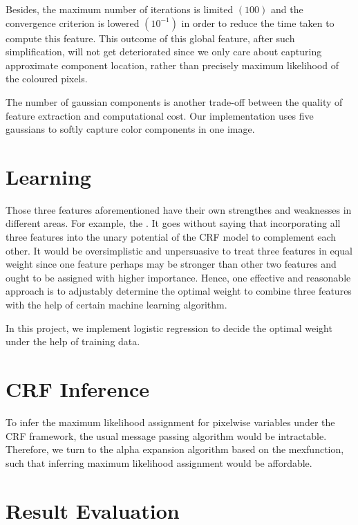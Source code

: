 \documentclass[10pt,twocolumn,letterpaper]{article}
\begin{document}
    Besides, the maximum number of iterations is limited $(100)$ and the convergence criterion is lowered $(10^{-1})$
    in order to reduce the time taken to compute this feature.  This outcome of this global feature, after such
    simplification, will not get deteriorated since we only care about capturing 
    approximate component location, rather than precisely maximum likelihood of the coloured pixels.

    The number of gaussian components is another trade-off between the quality of feature extraction
    and computational cost. Our implementation uses five gaussians to softly capture color components in one image. 

\section{Learning}
Those three features aforementioned have their own strengthes and weaknesses in different areas. For example, the .
It goes without saying that incorporating all three features into the unary potential of the CRF model 
to complement each other. It would be oversimplistic and unpersuasive to treat three features in equal weight 
since one feature perhaps may be stronger than other two features and ought to be assigned with higher importance.
Hence, one effective and reasonable approach is to adjustably determine the optimal weight to combine three features
with the help of certain machine learning algorithm. 

In this project, we implement logistic regression to decide the optimal weight under the help of training data.

\section{CRF Inference}
To infer the maximum likelihood assignment for pixelwise variables under the CRF framework,
the usual message passing algorithm would be intractable. Therefore, we turn to the alpha expansion algorithm 
based on the mexfunction, such that inferring maximum likelihood assignment would be affordable. 

\section{Result Evaluation}
\end{document}
